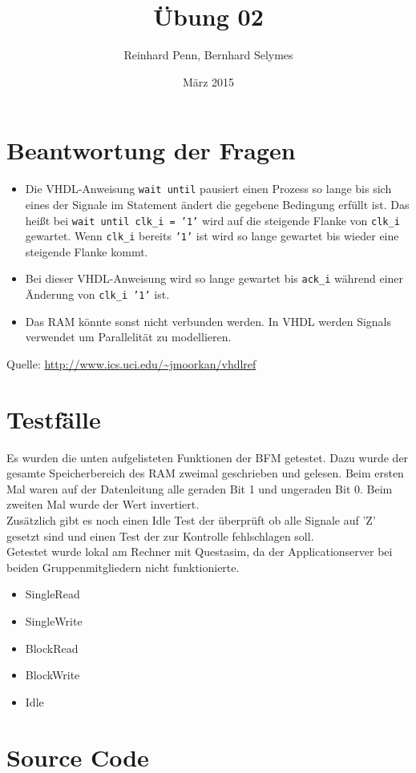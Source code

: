 \documentclass[12pt,a4paper]{article}
\begin{document}
\title{Übung 02}
\author{Reinhard Penn, Bernhard Selymes}
\date{März 2015}

\normalsize


\newcommand{\Uebung}{BFMSV}
\newcommand{\srcpath}{../../src}
\newcommand{\simpath}{../../sim}



\section{Beantwortung der Fragen}

\begin{itemize}
	\item Die VHDL-Anweisung \texttt{wait until} pausiert einen Prozess so lange bis sich eines der Signale im Statement ändert die gegebene Bedingung erfüllt ist. 
	Das heißt bei \texttt{wait until clk\_i = '1'} wird auf die steigende Flanke von \texttt{clk\_i} gewartet. Wenn \texttt{clk\_i} bereits \texttt{'1'} ist wird so lange gewartet bis wieder eine steigende Flanke kommt.
	\item Bei dieser VHDL-Anweisung wird so lange gewartet bis \texttt{ack\_i} während einer Änderung von \texttt{clk\_i '1'} ist.
	\item Das RAM könnte sonst nicht verbunden werden. In VHDL werden Signals verwendet um Parallelität zu modellieren.
\end{itemize}

Quelle: \url{http://www.ics.uci.edu/~jmoorkan/vhdlref}

\section{Testfälle}
Es wurden die unten aufgelisteten Funktionen der BFM getestet. Dazu wurde der gesamte Speicherbereich des RAM zweimal geschrieben und gelesen. Beim ersten Mal waren auf der Datenleitung alle geraden Bit 1 und ungeraden Bit 0. Beim zweiten Mal wurde der Wert invertiert. 
\\
Zusätzlich gibt es noch einen Idle Test der überprüft ob alle Signale auf 'Z' gesetzt sind und einen Test der zur Kontrolle fehlschlagen soll.
\\
Getestet wurde lokal am Rechner mit Questasim, da der Applicationserver bei beiden Gruppenmitgliedern nicht funktionierte.

\begin{itemize}
	\item SingleRead
	\item SingleWrite
	\item BlockRead
	\item BlockWrite
	\item Idle
\end{itemize}

\section{Source Code}






\end{document}
